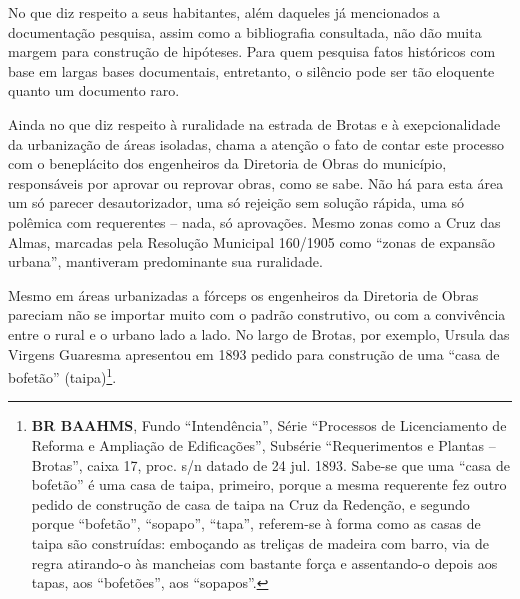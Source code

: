 
No que diz respeito a seus habitantes, além daqueles já mencionados a documentação pesquisa, assim como a bibliografia consultada, não dão muita margem para construção de hipóteses. Para quem pesquisa fatos históricos com base em largas bases documentais, entretanto, o silêncio pode ser tão eloquente quanto um documento raro.


Ainda no que diz respeito à ruralidade na estrada de Brotas e à exepcionalidade da urbanização de áreas isoladas, chama a atenção o fato de contar este processo com o beneplácito dos engenheiros da Diretoria de Obras do município, responsáveis por aprovar ou reprovar obras, como se sabe. Não há para esta área um só parecer desautorizador, uma só rejeição sem solução rápida, uma só polêmica com requerentes -- nada, só aprovações. Mesmo zonas como a Cruz das Almas, marcadas pela Resolução Municipal 160/1905 como ``zonas de expansão urbana'', mantiveram predominante sua ruralidade.

Mesmo em áreas urbanizadas a fórceps os engenheiros da Diretoria de Obras pareciam não se importar muito com o padrão construtivo, ou com a convivência entre o rural e o urbano lado a lado. No largo de Brotas, por exemplo, Ursula das Virgens Guaresma apresentou em 1893 pedido para construção de uma ``casa de bofetão'' (taipa)\footnote{\textbf{BR BAAHMS}, Fundo ``Intendência'', Série ``Processos de Licenciamento de Reforma e Ampliação de Edificações'', Subsérie ``Requerimentos e Plantas -- Brotas'', caixa 17, proc. s/n datado de 24 jul. 1893. Sabe-se que uma ``casa de bofetão'' é uma casa de taipa, primeiro, porque a mesma requerente fez outro pedido de construção de casa de taipa na Cruz da Redenção, e segundo porque ``bofetão'', ``sopapo'', ``tapa'', referem-se à forma como as casas de taipa são construídas: emboçando as treliças de madeira com barro, via de regra atirando-o às mancheias com bastante força e assentando-o depois aos tapas, aos ``bofetões'', aos ``sopapos''.}.  


